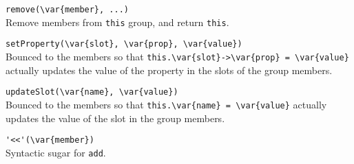 \begin{urbiscriptapi}
\item \lstinline|remove(\var{member}, ...)|\\
  Remove members from \lstinline|this| group, and return
  \lstinline|this|.

\item \lstinline|setProperty(\var{slot}, \var{prop}, \var{value})|\\
  Bounced to the members so that
  \lstinline|this.\var{slot}->\var{prop} = \var{value}|
  actually updates the value of the property 
  in the slots  of the group members.

\item \lstinline|updateSlot(\var{name}, \var{value})|\\
  Bounced to the members so that
  \lstinline|this.\var{name} = \var{value}|
  actually updates the value of the slot  in
  the group members.

\item \lstinline|'<<'(\var{member})|\\
  Syntactic sugar for \lstinline|add|.
\end{urbiscriptapi}


